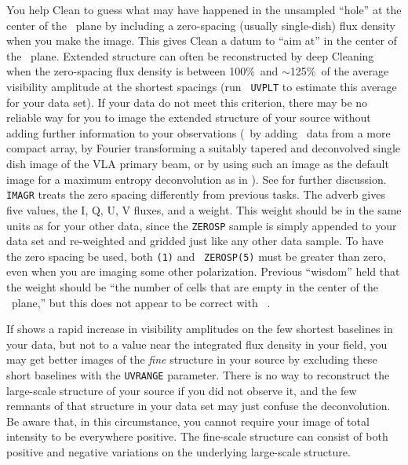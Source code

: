 
      You help Clean to guess what may have happened in the unsampled
``hole'' at the center of the \uv\ plane by including a zero-spacing
(usually single-dish) flux density when you make the image.  This
gives Clean a datum to ``aim at'' in the center of the \uv\ plane.
Extended structure can often be reconstructed by deep Cleaning when
the zero-spacing flux density is between 100\%\ and $\sim$125\%\ of
the average visibility amplitude at the shortest spacings (run {\tt
UVPLT} to estimate this average for your data set).  If your data do
not meet this criterion, there may be no reliable way for you to image
the extended structure of your source without adding further
information to your observations (\eg\ by adding \uv\ data from a more
compact array, by Fourier transforming a suitably tapered and
deconvolved single dish image of the VLA primary beam, or by using
such an image as the default image for a maximum entropy deconvolution
as in ).  See  for further discussion.  {\tt
IMAGR} treats the zero spacing differently from previous tasks.  The
adverb {\tt {}} gives five values, the I, Q, U, V fluxes,
and a weight.  This weight should be in the same units as for your
other data, since the {\tt ZEROSP} sample is simply appended to your
data set and re-weighted and gridded just like any other data sample.
To have the zero spacing be used, both {\tt {}(1)} and {\tt
ZEROSP(5)} must be greater than zero, even when you are imaging some
other polarization.  Previous ``wisdom'' held that the weight should
be ``the number of cells that are empty in the center of the \uv\
plane,'' but this does not appear to be correct with {\tt
{}}\@.

     If {\tt {}} shows a rapid increase in visibility
amplitudes on the few shortest baselines in your data, but not to a
value near the integrated flux density in your field, you may get
better images of the {\it fine\/} structure in your source by
excluding these short baselines with the {\tt UVRANGE} parameter.
There is no way to reconstruct the large-scale structure of your
source if you did not observe it, and the few remnants of that
structure in your data set may just confuse the deconvolution.  Be
aware that, in this circumstance, you cannot require your image of
total intensity to be everywhere positive.  The fine-scale structure
can consist of both positive and negative variations on the underlying
large-scale structure.


